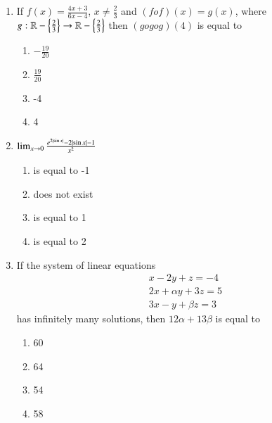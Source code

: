 \documentclass[journal]{IEEEtran}
\begin{document}
\begin{enumerate}
    \item If $f(x) = \frac{4x+3}{6x-4}$, $x \ne \frac{2}{3}$ and
    $(fof)(x) = g(x)$, where $g:\mathbb{R} - \left\{\frac{2}{3}\right\} \to
    \mathbb{R} - \left\{\frac{2}{3}\right\}$ then $(gogog)(4)$ is equal to
    
    \begin{multicols}{4}
\begin{enumerate}

        \item $-\frac{19}{20}$
        \item $\frac{19}{20}$
        \item -4
        \item 4
    \end{enumerate}
\end{multicols}

    \item $\lim_{x \to 0} \frac{e^{2\left\vert\sin x\right\vert} - 2\left\vert\sin x\right\vert - 1}{x^2}$
    
    \begin{multicols}{4}
\begin{enumerate}

        \item is equal to -1 
        \item does not exist
        \item is equal to 1 
        \item is equal to 2 
    \end{enumerate}
\end{multicols}

    \item If the system of linear equations
    \begin{align*}
        x - 2y + z = -4 \\
        2x + \alpha y + 3z = 5 \\
        3x - y + \beta z = 3
    \end{align*}
    has infinitely many solutions, then $12\alpha + 13\beta$ is equal to

    \begin{multicols}{4}
\begin{enumerate}

        \item 60
        \item 64
        \item 54
        \item 58
    \end{enumerate}
\end{multicols}


\end{enumerate}
\end{document}
